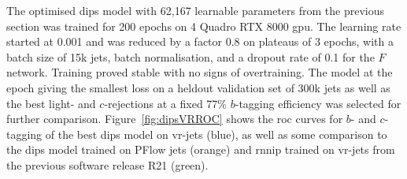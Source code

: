The optimised \gls{dips} model with 62,167 learnable parameters from the previous section was trained for 200 epochs on 4 Quadro RTX 8000 \gls{gpu}. The learning rate started at 0.001 and was reduced by a factor 0.8 on plateaus of 3 epochs, with a batch size of 15k jets, batch normalisation, and a dropout rate of 0.1 for the $F$ network. Training proved stable with no signs of overtraining. The model at the epoch giving the smallest loss on a heldout validation set of 300k jets as well as the best light- and $c$-rejections at a fixed 77\% $b$-tagging efficiency was selected for further comparison. Figure~\ref{fig:dipsVRROC} shows the \gls{roc} curves for $b$- and $c$-tagging of the best \gls{dips} model on \gls{vr}-jets (blue), as well as some comparison to the \gls{dips} model trained on PFlow jets (orange) and \gls{rnnip} trained on \gls{vr}-jets from the previous software release R21 (green). 

